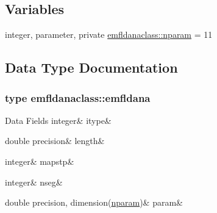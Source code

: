 \subsection*{Variables}
\begin{DoxyCompactItemize}
\item 
integer, parameter, private \mbox{\hyperlink{namespaceemfldanaclass_a3ce28adb644b4d35b7f3e9713a275828}{emfldanaclass\+::nparam}} = 11
\end{DoxyCompactItemize}


\subsection{Data Type Documentation}
\label{structemfldanaclass_1_1emfldana}
\subsubsection{type emfldanaclass\+::emfldana}
\begin{DoxyFields}{Data Fields}
\mbox{\label{namespaceemfldanaclass_a0f9482a746a37ef5287bb0b990c4244c}} 
integer&
itype&
\\
\hline

\mbox{\label{namespaceemfldanaclass_a94ad15c988b1d3fd9a7eb2902230b501}} 
double precision&
length&
\\
\hline

\mbox{\label{namespaceemfldanaclass_a4db12b7d942f212750921af22cc57a48}} 
integer&
mapstp&
\\
\hline

\mbox{\label{namespaceemfldanaclass_a9c550d5110930bddd92a57c1d9809e66}} 
integer&
nseg&
\\
\hline

\mbox{\label{namespaceemfldanaclass_a5d95e09d4f314af58ac2b9b0ecbdaa94}} 
double precision, dimension(\mbox{\hyperlink{namespaceemfldanaclass_a3ce28adb644b4d35b7f3e9713a275828}{nparam}})&
param&
\\
\hline

\end{DoxyFields}
